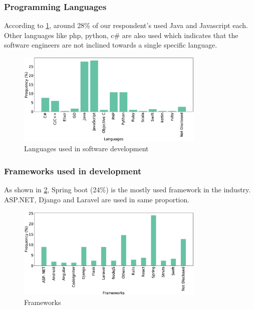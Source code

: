 \subsubsection{Programming Languages}
According to \cref{fig:languages}, around 28\% of our respondent's used Java and Javascript each. Other languages like php, python, c\# are also used which indicates that the software engineers are not inclined towards a single specific language.
\begin{figure}[]
\centering
  \includegraphics[width=0.8\textwidth]{Figures/Respondents_languages}
  \caption{Languages used in software development}
  \label{fig:languages}
\end{figure}

\subsubsection{Frameworks used in development}
As shown in \cref{fig:frameworks}, Spring boot (24\%) is the mostly used framework in the industry. ASP.NET, Django and Laravel are used in same proportion.
\begin{figure}[]
\centering
  \includegraphics[width=0.8\textwidth]{Figures/Respondents_frameworks}
  \caption{Frameworks}
  \label{fig:frameworks}
\end{figure}

